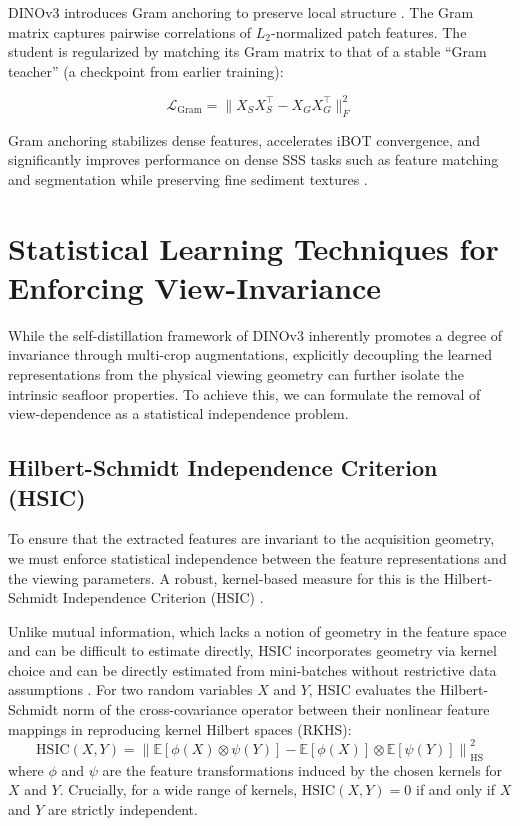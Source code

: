 \documentclass[12pt]{article}
\begin{document}
DINOv3 introduces Gram anchoring to preserve local structure \cite{oriane2025}. The Gram matrix captures pairwise correlations of $L_2$-normalized patch features. The student is regularized by matching its Gram matrix to that of a stable ``Gram teacher'' (a checkpoint from earlier training):

\begin{equation}
\mathcal{L}_{\text{Gram}} = \| X_S X_S^\top - X_G X_G^\top \|_F^2
\end{equation}

Gram anchoring stabilizes dense features, accelerates iBOT convergence, and significantly improves performance on dense SSS tasks such as feature matching and segmentation while preserving fine sediment textures \cite{oriane2025, hayat2025}.

\section{Statistical Learning Techniques for Enforcing View-Invariance}

While the self-distillation framework of DINOv3 inherently promotes a degree of invariance through multi-crop augmentations, explicitly decoupling the learned representations from the physical viewing geometry can further isolate the intrinsic seafloor properties. To achieve this, we can formulate the removal of view-dependence as a statistical independence problem. 

\subsection{Hilbert-Schmidt Independence Criterion (HSIC)}
To ensure that the extracted features are invariant to the acquisition geometry, we must enforce statistical independence between the feature representations and the viewing parameters. A robust, kernel-based measure for this is the Hilbert-Schmidt Independence Criterion (HSIC) \cite{HSIC_SSL}. 

Unlike mutual information, which lacks a notion of geometry in the feature space and can be difficult to estimate directly, HSIC incorporates geometry via kernel choice and can be directly estimated from mini-batches without restrictive data assumptions \cite{HSIC_SSL}. For two random variables $X$ and $Y$, HSIC evaluates the Hilbert-Schmidt norm of the cross-covariance operator between their nonlinear feature mappings in reproducing kernel Hilbert spaces (RKHS):
\begin{equation}
\text{HSIC}(X,Y) = \left\| \mathbb{E}[\phi(X)\otimes\psi(Y)] - \mathbb{E}[\phi(X)] \otimes \mathbb{E}[\psi(Y)] \right\|_{\text{HS}}^2
\end{equation}
where $\phi$ and $\psi$ are the feature transformations induced by the chosen kernels for $X$ and $Y$. Crucially, for a wide range of kernels, $\text{HSIC}(X,Y) = 0$ if and only if $X$ and $Y$ are strictly independent.
\end{document}
